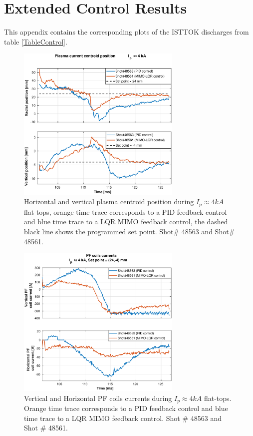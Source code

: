 \chapter{Extended Control Results }
\label{Control_Results}
This appendix contains the corresponding plots of the ISTTOK discharges from table \ref{TableControl}.

\begin{figure}[h]
	\centering
	\includegraphics[width=0.7\textwidth]{Chp5/PIDvsMIMO_563_561_2.eps}
	\caption{Horizontal and vertical plasma centroid position during  $I_p\approx 4kA$  flat-tops, orange time trace corresponds to a PID feedback control and blue time trace to a LQR MIMO feedback control, the dashed black line shows the programmed set point. Shot$\#$ 48563 and Shot$\#$ 48561.}
\end{figure}

\begin{figure}
	\centering
	\includegraphics[width=0.7\textwidth]{Chp5/PIDvsMIMO_563_561_curr_2.eps}
	\caption{  Vertical and Horizontal PF coils currents during  $I_p\approx 4kA$  flat-tops. Orange time trace corresponds to a PID feedback control and blue time trace to a LQR MIMO feedback control. Shot $\#$ 48563 and Shot $\#$ 48561.}
\end{figure}

